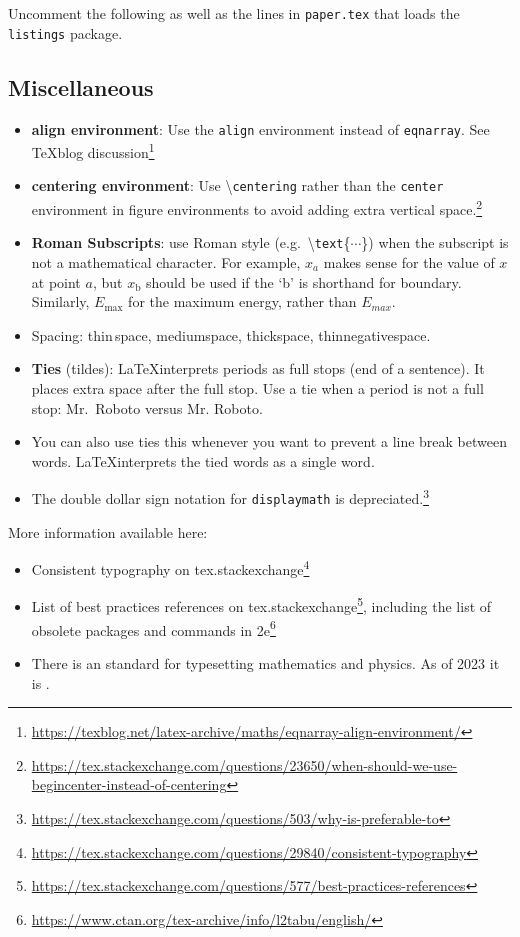 Uncomment the following as well as the lines in \texttt{paper.tex} that loads the \texttt{listings} package.
% 



\subsection{Miscellaneous}

\begin{itemize}
	\item \textbf{align environment}: Use the \texttt{align} environment instead of \texttt{eqnarray}. See TeXblog discussion\footnote{\url{https://texblog.net/latex-archive/maths/eqnarray-align-environment/}}
	\item \textbf{centering environment}: Use \textbackslash\texttt{centering} rather than the \texttt{center} environment in figure environments to avoid adding extra vertical space.\footnote{\url{https://tex.stackexchange.com/questions/23650/when-should-we-use-begincenter-instead-of-centering}}
	\item \textbf{Roman Subscripts}: use Roman style (e.g.~\textbackslash \texttt{text}\{$\cdots$\}) when the subscript is not a mathematical character. For example, $x_a$ makes sense for the value of $x$ at point $a$, but $x_\text{b}$ should be used if the `b' is shorthand for boundary. Similarly, $E_\text{max}$ for the maximum energy, rather than $E_{max}$.
	\item Spacing: thin\,space, medium\:space, thick\;space, thin\!negative\!space.
	\item \textbf{Ties} (tildes): \LaTeX interprets periods as full stops (end of a sentence). It places extra space after the full stop. Use a tie when a period is not a full stop: Mr.~Roboto versus Mr. Roboto. 
	\item You can also use ties this whenever you want to prevent a line break between words. \LaTeX interprets the tied words as a single word.
	\item The double dollar sign notation for \texttt{displaymath} is depreciated.\footnote{\url{https://tex.stackexchange.com/questions/503/why-is-preferable-to}}
\end{itemize}

More information available here:
\begin{itemize}
	\item Consistent typography on tex.stackexchange\footnote{\url{https://tex.stackexchange.com/questions/29840/consistent-typography}}
	\item List of best practices references on tex.stackexchange\footnote{\url{https://tex.stackexchange.com/questions/577/best-practices-references}}, including the list of obsolete packages and commands in 2e\footnote{\url{https://www.ctan.org/tex-archive/info/l2tabu/english/}}
	\item There is an  standard for typesetting mathematics and physics. As of 2023 it is .
\end{itemize}
